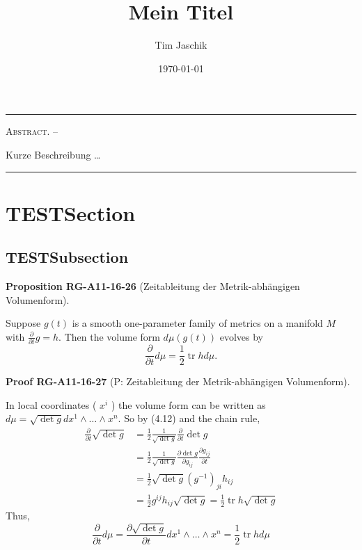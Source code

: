\documentclass[10pt, letterpaper]{article}
\title{Mein Titel}
\author{Tim Jaschik}
\date{\today}
\renewenvironment{abstract}
  {
    \begin{adjustwidth}{1.5cm}{1.5cm}
    \small
    \textsc{Abstract. –}%
  }
  {
    \end{adjustwidth}
  }
\newcommand{\CustomHeading}[3]{%
  \par\medskip\noindent%
  \textbf{#1 #2} \textnormal{(#3)}.\enskip%
}
\newenvironment{PROP}[2]{\CustomHeading{Proposition}{#1}{#2}}{}
\newenvironment{PROOF}[2]{\CustomHeading{Proof}{#1}{#2}}{}
\begin{document}
\maketitle
\rule{\textwidth}{0.5pt}
\begin{abstract}
Kurze Beschreibung …
\end{abstract}
\rule{\textwidth}{0.5pt}
\vspace{0.5cm}

\tableofcontents

\pagebreak

\section{TESTSection}

\subsection{TESTSubsection}

\begin{PROP}{RG-A11-16-26}{Zeitableitung der Metrik-abhängigen Volumenform}
Suppose $g(t)$ is a smooth one-parameter family of metrics on a manifold $M$ with $\frac{\partial}{\partial t} g=h$. Then the volume form $d \mu(g(t))$ evolves by
$$
\frac{\partial}{\partial t} d \mu=\frac{1}{2} \operatorname{tr} h d \mu .
$$
\end{PROP}

\begin{PROOF}{RG-A11-16-27}{P: Zeitableitung der Metrik-abhängigen Volumenform}
In local coordinates ( $x^{i}$ ) the volume form can be written as $d \mu=\sqrt{\operatorname{det} g} d x^{1} \wedge \ldots \wedge x^{n}$. So by (4.12) and the chain rule,
$$
\begin{aligned}
\frac{\partial}{\partial t} \sqrt{\operatorname{det} g} & =\frac{1}{2} \frac{1}{\sqrt{\operatorname{det} g}} \frac{\partial}{\partial t} \operatorname{det} g \\
& =\frac{1}{2} \frac{1}{\sqrt{\operatorname{det} g}} \frac{\partial \operatorname{det} g}{\partial g_{i j}} \frac{\partial g_{i j}}{\partial t} \\
& =\frac{1}{2} \sqrt{\operatorname{det} g}\left(g^{-1}\right)_{j i} h_{i j} \\
& =\frac{1}{2} g^{i j} h_{i j} \sqrt{\operatorname{det} g}=\frac{1}{2} \operatorname{tr} h \sqrt{\operatorname{det} g}
\end{aligned}
$$
Thus,
$$
\frac{\partial}{\partial t} d \mu=\frac{\partial \sqrt{\operatorname{det} g}}{\partial t} d x^{1} \wedge \ldots \wedge x^{n}=\frac{1}{2} \operatorname{tr} h d \mu
$$
\end{PROOF}
\end{document}
